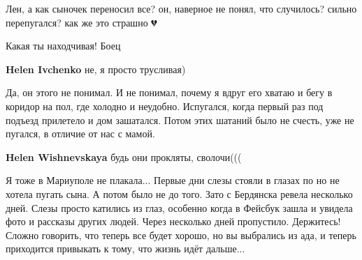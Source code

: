  
 
 
 
 

\qqSecCmt


Лен, а как сыночек переносил все? он, наверное не понял, что случилось? сильно перепугался? как же это страшно 💔


Какая ты находчивая! Боец 💪

\begin{itemize} %
\textbf{Helen Ivchenko} не, я просто трусливая)
\end{itemize} %


Да, он этого не понимал. И не понимал, почему я вдруг его хватаю и бегу в
коридор на пол, где холодно и неудобно. Испугался, когда первый раз под подъезд
прилетело и дом зашатался. Потом этих шатаний было не счесть, уже не пугался, в
отличие от нас с мамой.

\begin{itemize} %
\textbf{Helen Wishnevskaya} будь они прокляты, сволочи(((
\end{itemize} %


Я тоже в Мариуполе не плакала... Первые дни слезы стояли в глазах по но не
хотела пугать сына. А потом было не до того. Зато с Бердянска ревела несколько
дней. Слезы просто катились из глаз, особенно когда в Фейсбук зашла и увидела
фото и рассказы других людей. Через несколько дней пропустило. Держитесь!
Сложно говорить, что теперь все будет хорошо, но вы выбрались из ада, и теперь
приходится привыкать к тому, что жизнь идёт дальше...

